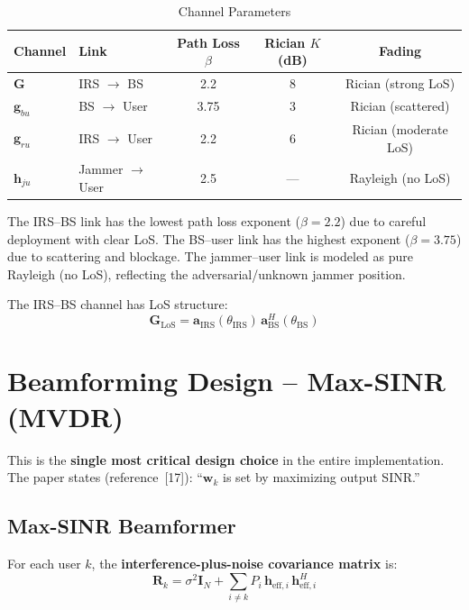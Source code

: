 \documentclass[11pt,a4paper]{article}
\begin{document}
\begin{table}[H]
\centering
\caption{Channel Parameters}
\begin{tabular}{llccc}
\toprule
\textbf{Channel} & \textbf{Link} & \textbf{Path Loss $\beta$} & \textbf{Rician $K$ (dB)} & \textbf{Fading} \\
\midrule
$\mathbf{G}$ & IRS $\to$ BS & 2.2 & 8 & Rician (strong LoS) \\
$\mathbf{g}_{bu}$ & BS $\to$ User & 3.75 & 3 & Rician (scattered) \\
$\mathbf{g}_{ru}$ & IRS $\to$ User & 2.2 & 6 & Rician (moderate LoS) \\
$\mathbf{h}_{ju}$ & Jammer $\to$ User & 2.5 & --- & Rayleigh (no LoS) \\
\bottomrule
\end{tabular}
\end{table}

The IRS--BS link has the lowest path loss exponent ($\beta = 2.2$) due to careful deployment with clear LoS.  The BS--user link has the highest exponent ($\beta = 3.75$) due to scattering and blockage.  The jammer--user link is modeled as pure Rayleigh (no LoS), reflecting the adversarial/unknown jammer position.

The IRS--BS channel has LoS structure:
\begin{equation}
\mathbf{G}_{\mathrm{LoS}} = \mathbf{a}_{\mathrm{IRS}}(\theta_{\mathrm{IRS}})\,\mathbf{a}_{\mathrm{BS}}^H(\theta_{\mathrm{BS}})
\end{equation}


\section{Beamforming Design -- Max-SINR (MVDR)}
\label{sec:beamforming}

This is the \textbf{single most critical design choice} in the entire implementation. The paper states (reference~[17]): ``$\mathbf{w}_k$ is set by maximizing output SINR.''

\subsection{Max-SINR Beamformer}

For each user $k$, the \textbf{interference-plus-noise covariance matrix} is:
\begin{equation}\label{eq:Rk}
\mathbf{R}_k = \sigma^2 \mathbf{I}_N + \sum_{i \neq k} P_i\, \mathbf{h}_{\mathrm{eff},i}\, \mathbf{h}_{\mathrm{eff},i}^H
\end{equation}
\end{document}

